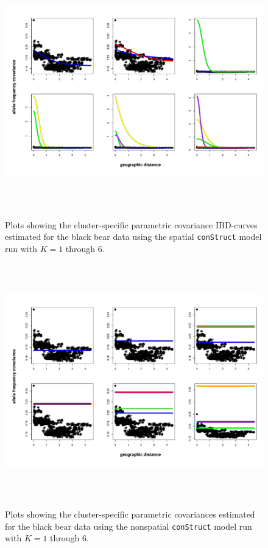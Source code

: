 \documentclass[12pt]{article}
\begin{document}
\begin{figure}
	\centering
		{\includegraphics[width=6in,height=4in]{figs/bears/bear_sp_clst_covs.pdf}}
	\caption{
	Plots showing the cluster-specific parametric covariance IBD-curves 
	estimated for the black bear data using 
	the spatial \texttt{conStruct} model run with $K=1$ through 6.
	 }\label{bear_sp_clst_covs}
\end{figure}

\begin{figure}
	\centering
		{\includegraphics[width=6in,height=4in]{figs/bears/bear_nsp_clst_covs.pdf}}
	\caption{
	Plots showing the cluster-specific parametric covariances 
	estimated for the black bear data using 
	the nonspatial \texttt{conStruct} model run with $K=1$ through 6.
    }\label{bear_nsp_clst_covs}
\end{figure}

\newpage
\clearpage


\newpage
\end{document}
